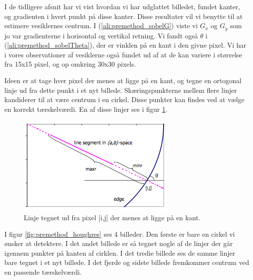 I de tidligere afsnit har vi vist hvordan vi har udglattet billedet, fundet kanter, og gradienten i hvert punkt på disse kanter. Disse resultater vil vi benytte til at estimere vesiklernes centrum. I (\ref{ali:premethod_sobelG}) viste vi $G_x$ og $G_y$ som jo var gradienterne i horisontal og vertikal retning. Vi fandt også $\theta$ i (\ref{ali:premethod_sobelTheta}), der er vinklen på en kant i den givne pixel. Vi har i vores observationer af vesiklerne også fundet ud af at de kan variere i størrelse fra 15x15 pixel, og op omkring 30x30 pixels.

Ideen er at tage hver pixel der menes at ligge på en kant, og tegne en ortogonal linje ud fra dette punkt i et nyt billede. Skæringspunkterne mellem flere linjer kandiderer til at være centrum i en cirkel. Disse punkter kan findes ved at vælge en korrekt tærskelværdi. En af disse linjer ses i figur \ref{fig:premethod_houghLines}. 

\begin{figure}[H]
	\centering
	\includegraphics[scale=1]{files/premethod/img/hough_lines.png}
	\caption{Linje tegnet ud fra pixel [i,j] der menes at ligge på en kant\cite{houghrep}.\label{fig:premethod_houghLines}}
\end{figure}

I figur \ref{fig:premethod_houghres} ses 4 billeder. Den første er bare en cirkel vi ønsker at detektere. I det andet billede er så tegnet nogle af de linjer der går igennem punkter på kanten af cirklen. I det tredie billede ses de samme linjer bare tegnet i et nyt billede. I det fjerde og sidste billede fremkommer centrum ved en passende tærskelværdi.

